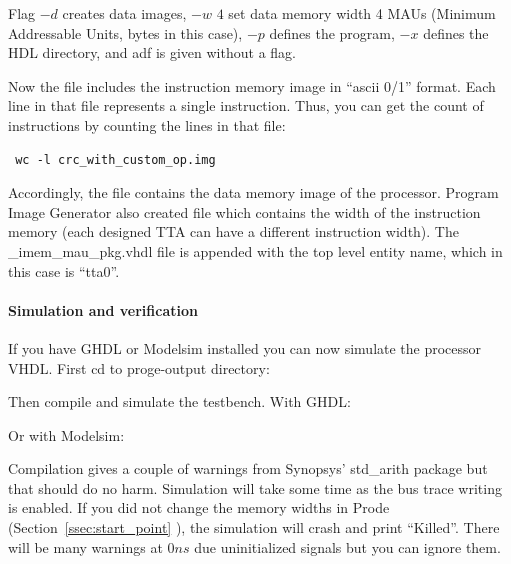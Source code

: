 \documentclass[a4paper,twoside]{tceusermanual}
\begin{document}
Flag $-d$ creates data images, $-w$ $4$ set data memory width 4 MAUs
(Minimum Addressable Units, bytes in this case), $-p$ defines the
program, $-x$ defines the HDL directory, and adf is given without a
flag.

Now the file  includes the instruction memory
image in ``ascii 0/1'' format. Each line in that file represents a single
instruction. Thus, you can get the count of instructions by counting the
lines in that file:

\begin{verbatim}
 wc -l crc_with_custom_op.img
\end{verbatim}


Accordingly, the file  contains the data
memory image of the processor. Program Image Generator also created file
 which contains the 
width of the instruction memory (each designed TTA can have a different 
instruction width). The \_imem\_mau\_pkg.vhdl file is appended with the top
level entity name, which in this case is ``tta0''.

\paragraph{Simulation and verification}

If you have GHDL or Modelsim installed you can now simulate the processor VHDL.
First cd to proge-output directory:


Then compile and simulate the testbench. With GHDL:



Or with Modelsim:



Compilation gives a couple of warnings from Synopsys' std\_arith
package but that should do no harm.  Simulation will take some time as
the bus trace writing is enabled. If you did not change the memory
widths in Prode (Section~\ref{ssec:start_point} ), the simulation will crash and print
``Killed''. There will be many warnings at $0 ns$ due uninitialized
signals but you can ignore them. 
\end{document}
